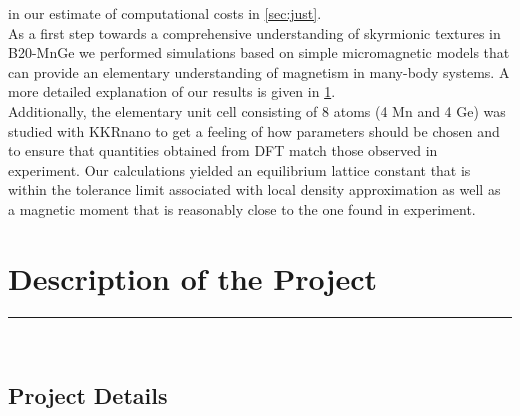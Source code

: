 \documentclass [a4paper, 12pt]{article}
\begin{document}
in our estimate of computational costs in \cref{sec:just}.
\\
As a first step towards a comprehensive understanding of skyrmionic textures in B20-MnGe we
performed simulations based on simple micromagnetic models that can provide an elementary understanding
of magnetism in many-body systems. A more detailed explanation of our results is given in \cref{sec:desc}.
\\
Additionally, the elementary unit cell consisting of 8 atoms (4 Mn and 4 Ge) was
studied with KKRnano to get a feeling of how parameters should be chosen and
to ensure that quantities obtained from DFT
match those observed in experiment.
Our calculations yielded an equilibrium lattice constant that is within the tolerance limit
associated with local density approximation as well as a magnetic moment that is reasonably close to
the one
found in experiment.



\section{Description of the Project}
\label{sec:desc}
\rule{\textwidth}{0.4pt}\\
\subsection{Project Details}
\end{document}
